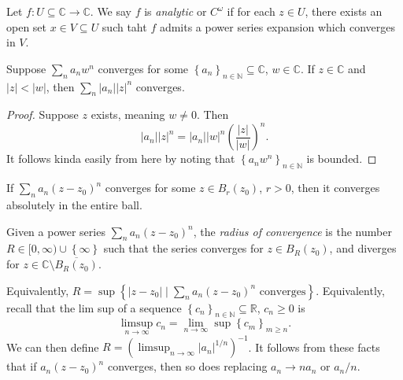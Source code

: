 
\begin{definition}\label{1.1.9}
	Let $f : U\subseteq \mathbb{C}  \to \mathbb{C} $. We say $f$ is \emph{analytic} or $C^\omega $ if for each $z\in U$, there exists an open set $x\in V \subseteq U$ such taht $f$ admits a power series expansion which converges in $V$.
\end{definition}

\begin{proposition}\label{1.1.10}
	Suppose $\sum_{n} a_nw^n$ converges for some $\left\{ a_n \right\} _{n\in\mathbb{N} } \subseteq \mathbb{C} $, $w\in\mathbb{C} $. If $z\in\mathbb{C} $ and $\left| z \right| <\left| w \right| $, then $\sum_{n} \left| a_n \right| \left| z \right| ^n$ converges.
\end{proposition}
\begin{proof}
	Suppose $z$ exists, meaning $w\neq 0$. Then
	\[
		\left| a_n \right| \left| z \right| ^n=\left| a_n \right|\left| w \right| ^n \left( \frac{\left| z \right| }{\left| w \right| }  \right) ^n
	.\]
	It follows kinda easily from here by noting that $\left\{ a_nw^n \right\}_{n\in\mathbb{N} } $ is bounded.
\end{proof}
\begin{corollary}\label{1.1.11}
	If $\sum_{n} a_n(z-z_0)^n$ converges for some $z\in B_r(z_0)$, $r>0$, then it converges absolutely in the entire ball.
\end{corollary}

\begin{definition}\label{1.1.12}
	Given a power series $\sum_{n} a_n(z-z_0)^n$, the \emph{radius of convergence} is the number $R\in [0,\infty )\cup \left\{ \infty  \right\} $ such that the series converges for $z\in B_R(z_0)$, and diverges for $z\in\mathbb{C} \setminus \overline{B_R(z_0)} $.
\end{definition}
Equivalently, $R=\sup \left\{ \left| z-z_0 \right| \mid \sum_{n} a_n(z-z_0)^n\text{ converges}  \right\} $. Equivalently, recall that the lim sup of a sequence $\left\{ c_n \right\} _{n\in\mathbb{N}} \subseteq \mathbb{R} $, $c_n\geq 0$ is
\[
	\limsup_{n \to \infty} c_n=\lim_{n\to \infty } \sup \left\{ c_m \right\}_{m\geq n} 
.\]
We can then define $R=\left(\limsup_{n \to \infty} \left| a_n \right| ^{1/n} \right)^{-1} $. It follows from these facts that if $a_n(z-z_0)^n$ converges, then so does replacing $a_n\to na_n$ or $a_n/n$.

